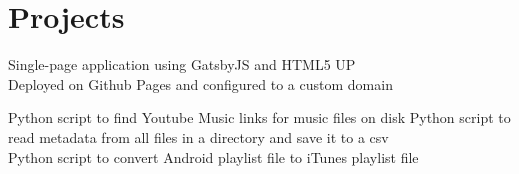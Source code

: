 \documentclass[]{resume}
\begin{document}
\begin{minipage}[t]{0.66\textwidth}

\section{Projects}

Single-page application using GatsbyJS and HTML5 UP 
\\ Deployed on Github Pages and configured to a custom domain

Python script to find Youtube Music links for music files on disk
Python script to read metadata from all files in a directory and save it to a csv \\
Python script to convert Android playlist file to iTunes playlist file


\end{minipage} 
\end{document}
